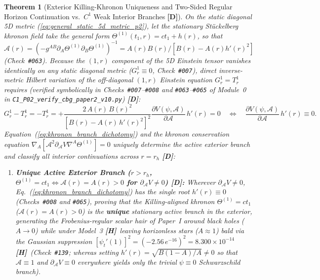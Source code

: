 \documentclass[11pt,a4paper]{article}
\newcommand{\catD}{\textbf{\textcolor{blue!75!black}{[D]}}}
\newcommand{\catH}{\textbf{\textcolor{orange!85!black}{[H]}}}
\theoremstyle{plain}
\newtheorem{theorem}{Theorem}[section]
\theoremstyle{definition}
\theoremstyle{remark}
\numberwithin{equation}{section}
\begin{document}
\begin{theorem}[Exterior Killing-Khronon Uniqueness and Two-Sided Regular Horizon Continuation vs.\ $C^1$ Weak Interior Branches \catD]
\label{thm:khronon_branch_dichotomy}
On the static diagonal 5D metric (\ref{eq:general_static_5d_metric_p2}), let the stationary St\"uckelberg khronon field take the general form $\Theta^{(1)}(t_1, r) = c t_1 + h(r)$, so that $\mathcal{A}(r) = (-g^{AB}\partial_A\Theta^{(1)}\partial_B\Theta^{(1)})^{-1} = A(r)B(r)/[B(r) - A(r)h'(r)^2]$ (Check~\texttt{\#063}). Because the $(1, r)$ component of the 5D Einstein tensor vanishes identically on any static diagonal metric ($G^1_r \equiv 0$, Check~\texttt{\#007}), direct inverse-metric Hilbert variation of the off-diagonal $(1, r)$ Einstein equation $G^1_r = T^1_r$ requires (verified symbolically in Checks~\texttt{\#007}--\texttt{\#008} and \texttt{\#063}--\texttt{\#065} of Module~0 in \allowbreak\texttt{C1\_P02\_verify\_cbg\_paper2\_v10.py}) \catD:
\begin{equation}
  G^1_r - T^1_r = -T^1_r = +\frac{2\,A(r)\,B(r)^2}{\left[B(r) - A(r)\,h'(r)^2\right]^2}\frac{\partial V(\psi, \mathcal{A})}{\partial \mathcal{A}}\,h'(r) = 0 \quad \Longleftrightarrow \quad \frac{\partial V(\psi, \mathcal{A})}{\partial \mathcal{A}}\,h'(r) \equiv 0.
  \label{eq:khronon_branch_dichotomy}
\end{equation}
Equation~(\ref{eq:khronon_branch_dichotomy}) and the khronon conservation equation $\nabla_A[\mathcal{A}^2\partial_{\mathcal{A}}V\nabla^A\Theta^{(1)}] = 0$ uniquely determine the active exterior branch and classify all interior continuations across $r = r_h$ \catD:
\begin{enumerate}
  \item[\textnormal{(i)}] \textbf{Unique Active Exterior Branch ($r > r_h$, $\Theta^{(1)} = ct_1 \iff \mathcal{A}(r) = A(r) > 0$ for $\partial_{\mathcal{A}}V \neq 0$) \catD:} Wherever $\partial_{\mathcal{A}}V \neq 0$, Eq.~(\ref{eq:khronon_branch_dichotomy}) has the single root $h'(r) \equiv 0$ (Checks~\texttt{\#008} and \texttt{\#065}), proving that the Killing-aligned khronon $\Theta^{(1)} = ct_1$ ($\mathcal{A}(r) = A(r) > 0$) is the \textbf{unique} stationary active branch in the exterior, generating the Frobenius-regular scalar hair of \textit{Paper~I} \cite{jimenez2026a} around black holes ($A \to 0$) while under Model~3 \catH\ leaving horizonless stars ($A \approx 1$) bald via the Gaussian suppression $[\psi_t'(1)]^2 = (-2.56\,e^{-16})^2 = 8.300 \times 10^{-14}$ \catH\ (Check~\texttt{\#139}; whereas setting $h'(r) = \sqrt{B(1-A)/A} \neq 0$ so that $\mathcal{A} \equiv 1$ and $\partial_{\mathcal{A}}V \equiv 0$ everywhere yields only the trivial $\psi \equiv 0$ Schwarzschild branch).

\end{enumerate}
\end{theorem}
\end{document}
